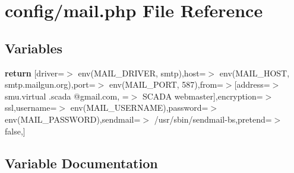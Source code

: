 \section{config/mail.php File Reference}
\label{config_2mail_8php}
\subsection*{Variables}
\begin{DoxyCompactItemize}
\item 
{\bf return} [\textquotesingle{}driver\textquotesingle{}=$>$ env(\textquotesingle{}M\+A\+I\+L\+\_\+\+D\+R\+I\+V\+E\+R\textquotesingle{}, \textquotesingle{}smtp\textquotesingle{}),\textquotesingle{}host\textquotesingle{}=$>$ env(\textquotesingle{}M\+A\+I\+L\+\_\+\+H\+O\+S\+T\textquotesingle{}, \textquotesingle{}smtp.\+mailgun.\+org\textquotesingle{}),\textquotesingle{}port\textquotesingle{}=$>$ env(\textquotesingle{}M\+A\+I\+L\+\_\+\+P\+O\+R\+T\textquotesingle{}, 587),\textquotesingle{}from\textquotesingle{}=$>$[\textquotesingle{}address\textquotesingle{}=$>$ \textquotesingle{}smu.\+virtual .scada @gmail.\+com\textquotesingle{}, \textquotesingle{}=$>$ \textquotesingle{}S\+C\+A\+D\+A webmaster\textquotesingle{}],\textquotesingle{}encryption\textquotesingle{}=$>$ \textquotesingle{}ssl\textquotesingle{},\textquotesingle{}username\textquotesingle{}=$>$ env(\textquotesingle{}M\+A\+I\+L\+\_\+\+U\+S\+E\+R\+N\+A\+M\+E\textquotesingle{}),\textquotesingle{}password\textquotesingle{}=$>$ env(\textquotesingle{}M\+A\+I\+L\+\_\+\+P\+A\+S\+S\+W\+O\+R\+D\textquotesingle{}),\textquotesingle{}sendmail\textquotesingle{}=$>$ \textquotesingle{}/usr/sbin/sendmail-\/bs\textquotesingle{},\textquotesingle{}pretend\textquotesingle{}=$>$ false,]
\end{DoxyCompactItemize}


\subsection{Variable Documentation}
